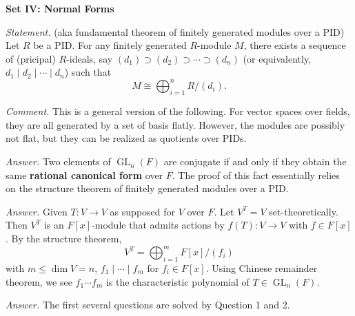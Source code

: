 \documentclass{mathproblems}
\begin{document}
\newpage

\centerline {\textbf{Set IV: Normal Forms}}

\begin{questions}


\textit{Statement.} (aka fundamental theorem of finitely generated modules over a PID) Let $R$ be a PID. For any finitely generated $R$-module $M$, there exists a sequence of (pricipal) $R$-ideals, say $(d_1)\supset (d_2) \supset \cdots \supset (d_n)$ (or equivalently, $d_1 \mid d_2 \mid \cdots \mid d_n$) such that
$$
M\cong \bigoplus_{i=1}^n R/(d_i).
$$

\textit{Comment.} This is a general version of the following. For vector spaces over fields, they are all generated by a set of basis flatly. However, the modules are possibly not flat, but they can be realized as quotients over PIDs.

\textit{Answer.} Two elements of $\operatorname{GL}_n(F)$ are conjugate if and only if they obtain the same {\color{violet}\textbf{rational canonical form}} over $F$. The proof of this fact essentially relies on the structure theorem of finitely generated modules over a PID.


\textit{Answer.} Given $T: V\to V$ as supposed for $V$ over $F$. Let $V^T=V$ set-theoretically. Then $V^T$ is an $F[x]$-module that admits actions by $f(T):V \to V$ with $f\in F[x]$. By the structure theorem,
$$
V^T=\bigoplus_{i=1}^m F[x]/(f_i)
$$
with $m\leq \dim V=n$, $f_1\mid \cdots \mid f_m$ for $f_i\in F[x]$. Using Chinese remainder theorem, we see $f_1\cdots f_m$ is the characteristic polynomial of $T\in \operatorname{GL}_n(F)$.


\textit{Answer.} The first several questions are solved by Question 1 and 2.


\end{questions}
\end{document}
